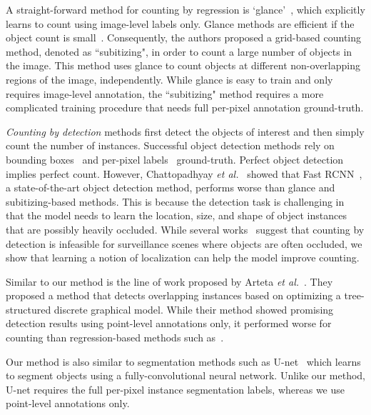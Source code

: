 \documentclass[runningheads]{llncs}
\begin{document}
A straight-forward method for counting by regression is `glance'~\cite{chattopadhyay2016counting}, which explicitly learns to count using image-level labels only. Glance methods are efficient if the object count is small~\cite{chattopadhyay2016counting}. Consequently, the authors proposed a grid-based counting method, denoted as ``subitizing", in order to  count a large number of objects in the image.  This method uses glance to count objects at different non-overlapping regions of the image, independently. While glance is easy to train and only requires image-level annotation, the ``subitizing" method requires a more complicated training procedure that needs full per-pixel annotation ground-truth.

\textit{Counting by detection} methods first detect the objects of interest and then simply count the number of instances. Successful object detection methods rely on bounding boxes~\cite{ren2015faster,redmon2016you,liu2016ssd} and per-pixel labels~\cite{long2015fully,jegou2017one,zhao2017pyramid} ground-truth.  Perfect object detection implies perfect count. However, Chattopadhyay \emph{et al.}~\cite{chattopadhyay2016counting} showed that Fast RCNN~\cite{girshick2015fastrcnn}, a state-of-the-art object detection method, performs worse than glance and subitizing-based methods. This is because the detection task is challenging in that the model needs to learn the location, size, and shape of object instances that are possibly heavily occluded. While several works~\cite{chattopadhyay2016counting,onoro2016towards,lempitsky2010learning} suggest that counting by detection is infeasible for surveillance scenes where objects are often occluded, we show that learning a notion of localization can help the model improve counting.

Similar to our method is the line of work proposed by Arteta \emph{et al.}~\cite{Arteta2012,Arteta2013,Arteta2016c}. They proposed a method that detects overlapping instances based on optimizing a tree-structured discrete graphical model. While their method showed promising detection results using point-level annotations only, it performed worse for counting than regression-based methods such as~\cite{lempitsky2010learning}. 

Our method is also similar to segmentation methods such as U-net~\cite{Ronneberger2015} which learns to segment objects using a fully-convolutional neural network. Unlike our method, U-net requires the full per-pixel instance segmentation labels, whereas we use point-level annotations only.
\end{document}
